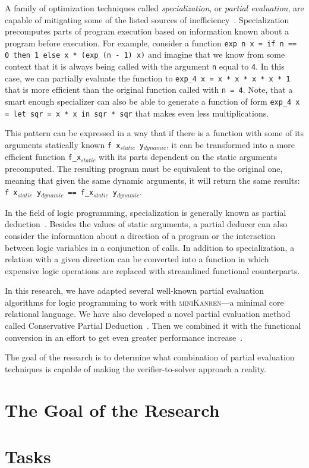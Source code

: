 \documentclass[crop=false]{standalone}
\begin{document}
A family of optimization techniques called \emph{specialization}, or \emph{partial evaluation}, are capable of mitigating some of the listed sources of inefficiency~\cite{de1999conjunctive,verbitskaia2021empirical}. 
Specialization precomputes parts of program execution based on information known about a program before execution. 
For example, consider a function \texttt{exp n x = if n == 0 then 1 else x * (exp (n - 1) x)} and imagine that we know from some context that it is always being called with the argument \texttt{n} equal to  \texttt{4}. 
In this case, we can partially evaluate the function to \texttt{exp\_4 x = x * x * x * x * 1} that is more efficient than the original function called with \texttt{n = 4}. 
Note, that a smart enough specializer can also be able to generate a function of form \texttt{exp\_4 x = let sqr = x * x in sqr * sqr} that makes even less multiplications. 

This pattern can be expressed in a way that if there is a function with some of its arguments statically known \texttt{f x$_{static}$ y$_{dynamic}$}, it can be transformed into a more efficient function \texttt{f\_x$_{static}$} with its parts dependent on the static arguments precomputed.
The resulting program must be equivalent to the original one, meaning that given the same dynamic arguments, it will return the same results: \texttt{f x$_{static}$ y$_{dynamic}$ == f\_x$_{static}$ y$_{dynamic}$}.

In the field of logic programming, specialization is generally known as partial deduction~\cite{komorowski1992introduction}. 
Besides the values of static arguments, a partial deducer can also consider the information about a direction of a program or the interaction between logic variables in a conjunction of calls. 
In addition to specialization, a relation with a given direction can be converted into a function in which expensive logic operations are replaced with streamlined functional counterparts. 


In this research, we have adapted several well-known partial evaluation algorithms for logic programming to work with \textsc{miniKanren}---a minimal core relational language. 
We have also developed a novel partial evaluation method called Conservative Partial Deduction~\cite{verbitskaia2021empirical}.
Then we combined it with the functional conversion in an effort to get even greater performance increase~\cite{verbitskaia2024case}. 

The goal of the research is to determine what combination of partial evaluation techniques is capable of making the verifier-to-solver approach a reality. 

\section{The Goal of the Research}
\section{Tasks}
\end{document}
